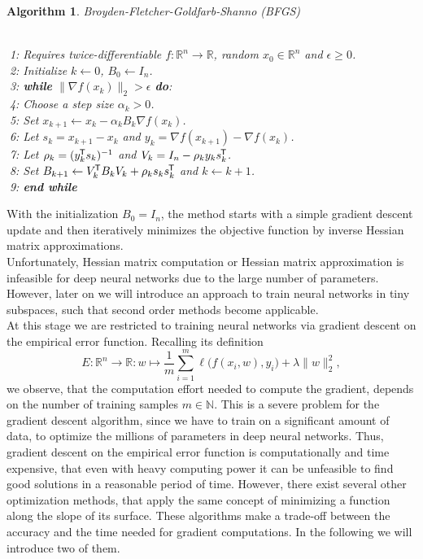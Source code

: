 \documentclass[11pt, a4paper]{article}
\newtheorem{algorithm}[theorem]{Algorithm}
\newcommand{\N}{\mathbb{N}}
\newcommand{\R}{\mathbb{R}}
\newcommand*{\tr}{^{\mkern-1.5mu\mathsf{T}}}
\begin{document}
\begin{algorithm}
\caption{Broyden-Fletcher-Goldfarb-Shanno (BFGS)} \ \\
\textcolor{white}{$\Big |$}1: Requires twice-differentiable $f: \R^n \to \R$, random $x_0 \in \R^n$ and  $\epsilon \geq 0$. \\
\textcolor{white}{$\Big |$}2: Initialize $k \leftarrow 0$, $B_0 \leftarrow I_n$. \\
\textcolor{white}{$\Big |$}3: \textbf{while} $ \big \| \nabla f(x_k) \big \|_2 > \epsilon $ \textbf{do}: \\
\textcolor{white}{$\Big |$}4: \quad Choose a step size $\alpha_k > 0$. \\
\textcolor{white}{$\Big |$}5: \quad Set $x_{k+1} \leftarrow x_k - \alpha_k B_k \nabla f(x_{k})$. \\
\textcolor{white}{$\Big |$}6: \quad Let $s_k = x_{k+1} - x_{k}$ and $y_k = \nabla f(x_{k+1}) - \nabla f(x_{k})$. \\
\textcolor{white}{$\Big |$}7: \quad Let $\rho_k = (y_k\tr s_k)^{-1}$ and $V_k = I_n - \rho_k y_k s_k\tr $. \\
\textcolor{white}{$\Big |$}8: \quad Set $B_{k+1} \leftarrow V_k\tr B_{k}V_k + \rho_k s_k s_k\tr $ and $k \leftarrow k+1$. \\
\textcolor{white}{$\Big |$}9: \textbf{end while}
\end{algorithm}

With the initialization $B_0 = I_n$, the method starts with a simple gradient descent update and then iteratively minimizes the objective function by inverse Hessian matrix approximations. \\

Unfortunately, Hessian matrix computation or Hessian matrix approximation is infeasible for deep neural networks due to the large number of parameters. However, later on we will introduce an approach to train neural networks in tiny subspaces, such that second order methods become applicable. \\

At this stage we are restricted to training neural networks via gradient descent on the empirical error function. Recalling its definition
 \[ E : \R^n \to \R : w \mapsto \frac{1}{m} \sum_{i=1}^{m} \ell \big ( f(x_i,w),y_i \big) + \lambda \big \| w \big \|_2^2, \]
we observe, that the computation effort needed to compute the gradient, depends on the number of training samples $m \in \N$. This is a severe problem for the gradient descent algorithm, since we have to train on a significant amount of data, to optimize the millions of parameters in deep neural networks. Thus, gradient descent on the empirical error function is computationally and time expensive, that even with heavy computing power it can be unfeasible to find good solutions in a reasonable period of time. However, there exist several other optimization methods, that apply the same concept of minimizing a function along the slope of its surface. These algorithms make a trade-off between the accuracy and the time needed for gradient computations. In the following we will introduce two of them. \\
\end{document}
